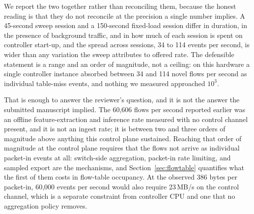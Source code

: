 \documentclass{ieeeaccess}
\begin{document}
We report the two together rather than reconciling them, because the honest
reading is that they do not reconcile at the precision a single number implies.
A 45-second sweep session and a 150-second fixed-load session differ in duration,
in the presence of background traffic, and in how much of each session is spent
on controller start-up, and the spread across sessions, 34 to 114 events per
second, is wider than any variation the sweep attributes to offered rate. The
defensible statement is a range and an order of magnitude, not a ceiling: on this
hardware a single controller instance absorbed between 34 and 114 novel flows per
second as individual table-miss events, and nothing we measured approached $10^3$.

That is enough to answer the reviewer's question, and it is not the answer the
submitted manuscript implied. The 60,606 flows per second reported earlier was an
offline feature-extraction and inference rate measured with no control channel
present, and it is not an ingest rate; it is between two and three orders of
magnitude above anything this control plane sustained. Reaching that order of
magnitude at the control plane requires that the flows not arrive as individual
packet-in events at all: switch-side aggregation, packet-in rate limiting, and
sampled export are the mechanisms, and Section~\ref{sec:flowtable} quantifies
what the first of them costs in flow-table occupancy. At the observed 386 bytes
per packet-in, 60,000 events per second would also require 23\,MB/s on the
control channel, which is a separate constraint from controller CPU and one that
no aggregation policy removes.
\end{document}
